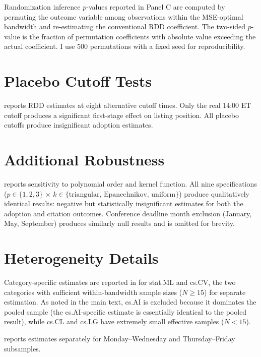 \documentclass[12pt]{article}
\begin{document}
Randomization inference $p$-values reported in  Panel C are computed by permuting the outcome variable among observations within the MSE-optimal bandwidth and re-estimating the conventional RDD coefficient. The two-sided $p$-value is the fraction of permutation coefficients with absolute value exceeding the actual coefficient. I use 500 permutations with a fixed seed for reproducibility.


\section{Placebo Cutoff Tests}

 reports RDD estimates at eight alternative cutoff times. Only the real 14:00 ET cutoff produces a significant first-stage effect on listing position. All placebo cutoffs produce insignificant adoption estimates.




\section{Additional Robustness}

 reports sensitivity to polynomial order and kernel function. All nine specifications ($p \in \{1,2,3\}$ $\times$ $k \in \{\text{triangular, Epanechnikov, uniform}\}$) produce qualitatively identical results: negative but statistically insignificant estimates for both the adoption and citation outcomes. Conference deadline month exclusion (January, May, September) produces similarly null results and is omitted for brevity.





\section{Heterogeneity Details}

Category-specific estimates are reported in  for stat.ML and cs.CV, the two categories with sufficient within-bandwidth sample sizes ($N \geq 15$) for separate estimation. As noted in the main text, cs.AI is excluded because it dominates the pooled sample (the cs.AI-specific estimate is essentially identical to the pooled result), while cs.CL and cs.LG have extremely small effective samples ($N < 15$).

 reports estimates separately for Monday--Wednesday and Thursday--Friday subsamples.
\end{document}

